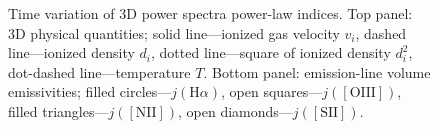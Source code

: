\documentclass[useAMS,usenatbib]{mn2e}
\newcounter{ionstage} %
\newcommand{\ion}[2]{\setcounter{ionstage}{#2}%
  \ensuremath{\mathrm{#1\,\scriptstyle\Roman{ionstage}}}} %
\newcommand\oiii{[\ion{O}{3}]} %
\providecommand{\DIFadd}[1]{{\protect\color{red!70!black}#1}} %
\providecommand{\DIFdel}[1]{} %
\providecommand{\DIFdelbegin}{} %
\providecommand{\DIFaddFL}[1]{\DIFadd{#1}} %
\providecommand{\DIFdelFL}[1]{} %
\providecommand{\DIFaddbeginFL}{} %
\providecommand{\DIFaddendFL}{} %
\providecommand{\DIFdelbeginFL}{} %
\providecommand{\DIFdelendFL}{} %
\begin{document}
\begin{figure}
\DIFaddendFL \caption{Time variation of \DIFaddbeginFL \DIFaddFL{3D }\DIFaddendFL power \DIFdelbeginFL \DIFdelFL{spectrum gradient for }\DIFdelendFL \DIFaddbeginFL \DIFaddFL{spectra power-law indices. Top panel: }\DIFaddendFL 3D physical
  quantities\DIFdelbeginFL \DIFdelFL{. Dashed line: square of ionized density $d_i^2$}\DIFdelendFL \DIFaddbeginFL \DIFaddFL{; solid line---ionized
  gas velocity $v_i$}\DIFaddendFL , \DIFdelbeginFL \DIFdelFL{dot-dashed line: ionized }\DIFdelendFL \DIFaddbeginFL \DIFaddFL{dashed line---ionized }\DIFaddendFL density $d_i$, \DIFdelbeginFL \DIFdelFL{short-dashed line: }\DIFdelendFL \DIFaddbeginFL \DIFaddFL{dotted line---square of }\DIFaddendFL ionized \DIFdelbeginFL \DIFdelFL{gas velocity $v_i$}\DIFdelendFL \DIFaddbeginFL \DIFaddFL{density $d_i^2$}\DIFaddendFL ,
  \DIFdelbeginFL \DIFdelFL{dotted line: temperature }\DIFdelendFL \DIFaddbeginFL \DIFaddFL{dot-dashed line---temperature }\DIFaddendFL $T$. \DIFdelbeginFL \DIFdelFL{Filled circles}\DIFdelendFL \DIFaddbeginFL \DIFaddFL{Bottom panel}\DIFaddendFL : \DIFdelbeginFL \DIFdelFL{H$\alpha$ emissivity in 3D }\DIFdelendFL \DIFaddbeginFL \DIFaddFL{emission-line
  volume emissivities; filled circles---}\DIFaddendFL $j(\mathrm{H}\alpha)$, open
  \DIFdelbeginFL \DIFdelFL{squares:
  }%
\DIFdelFL{$\lambda$5007 emissivity in 3D }\DIFdelendFL \DIFaddbeginFL \DIFaddFL{squares---}\DIFaddendFL $j(\mathrm{[OIII]})$\DIFaddbeginFL \DIFaddFL{, filled
  triangles---$j(\mathrm{[NII]})$, open diamonds---$j(\mathrm{[SII]})$}\DIFaddendFL .}
\label{fig:psevol}
\end{figure}
\DIFdelbegin %
{%
\DIFdel{Power-law indices for the 3D velocity, density and weighted
  velocity spectra.}}
\DIFdel{Time}%
\DIFdel{$n(v_i)$ }%
\DIFdel{$n(d_i)$ }%
\DIFdel{$n(v_i d_i^{1/3})$}%
\DIFdel{150,000 }%
\DIFdel{-3.23 }%
\DIFdel{-3.22 }%
\DIFdel{-3.17 }%
\DIFdel{200,000 }%
\DIFdel{-3.06 }%
\DIFdel{-3.12 }%
\DIFdel{-3.09 }%
\end{document}
